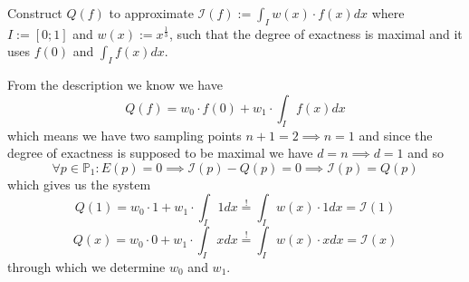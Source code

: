 \begin{example}
   Construct \(Q(f)\) to approximate \(\mathcal{I}(f) := \int_I w(x) \cdot f(x) dx\) where \(I := [0; 1]\) and \(w(x) := x^\frac{1}{3}\), such that the degree of exactness is maximal and it uses \(f(0)\) and \(\int_I f(x) dx\).

   From the description we know we have
   \[Q(f) = w_0 \cdot f(0) + w_1 \cdot \int_I f(x) dx\]
   which means we have two sampling points \(n + 1 = 2 \implies n = 1\) and since the degree of exactness is supposed to be maximal we have \(d = n \implies d = 1\) and so
   \[\forall p \in \mathbb{P}_1: E(p) = 0 \implies \mathcal{I}(p) - Q(p) = 0 \implies \mathcal{I}(p) = Q(p)\]
   which gives us the system
   \[Q(1) = w_0 \cdot 1 + w_1 \cdot \int_I 1 dx \overset{!}{=} \int_I w(x) \cdot 1 dx = \mathcal{I}(1)\]
   \[Q(x) = w_0 \cdot 0 + w_1 \cdot \int_I x dx \overset{!}{=} \int_I w(x) \cdot x dx = \mathcal{I}(x)\]
   through which we determine \(w_0\) and \(w_1\).
\end{example}

